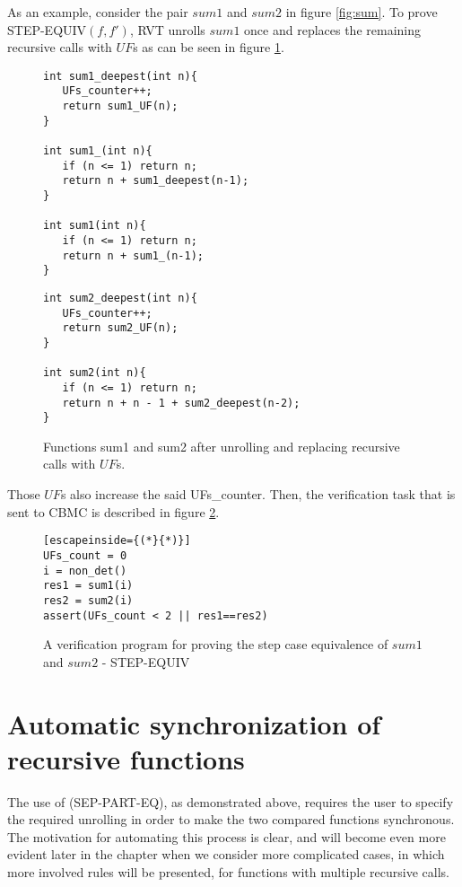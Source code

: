As an example, consider the pair $sum1$ and $sum2$ in figure \ref{fig:sum}. To prove STEP-EQUIV$(f,f')$, RVT unrolls $sum1$ once and replaces the remaining recursive calls with $UF$s as can be seen in figure \ref{fig:sumUnrolled}.
\begin{figure}[h]
\begin{center}
\begin{minipage}{7 cm}
\begin{lstlisting}
int sum1_deepest(int n){
   UFs_counter++;
   return sum1_UF(n);
}

int sum1_(int n){
   if (n <= 1) return n;
   return n + sum1_deepest(n-1);
}

int sum1(int n){
   if (n <= 1) return n;
   return n + sum1_(n-1);
}
\end{lstlisting}
\end{minipage}
\begin{minipage}{7 cm}
\begin{lstlisting}
int sum2_deepest(int n){
   UFs_counter++;
   return sum2_UF(n);
}

int sum2(int n){
   if (n <= 1) return n;
   return n + n - 1 + sum2_deepest(n-2);
}
\end{lstlisting}
\end{minipage}
\caption{Functions sum1 and sum2 after unrolling and replacing recursive calls with $UF$s.}
\label{fig:sumUnrolled}
\end{center}
\end{figure} 
Those $UF$s also increase the said UFs\_counter. Then, the verification task that is sent to CBMC is described in figure \ref{fig:rvtstepcase}.

\begin{figure} [h]
\begin{center}
\begin{minipage}{7 cm}
\begin{lstlisting}[escapeinside={(*}{*)}]
UFs_count = 0
i = non_det()
res1 = sum1(i)
res2 = sum2(i)
assert(UFs_count < 2 || res1==res2)
\end{lstlisting}
\end{minipage}
\caption{A verification program for proving the step case equivalence of $sum1$ and $sum2$ - STEP-EQUIV}
\label{fig:rvtstepcase}
\end{center}
\end{figure}

\section{Automatic synchronization of recursive functions}
The use of (SEP-PART-EQ), as demonstrated above, requires the user to specify the required unrolling in order to make the two compared functions synchronous. The motivation for automating this process is clear, and will become even more evident later in the chapter when we consider more complicated cases, in which more involved rules will be presented, for functions with multiple recursive calls. 

